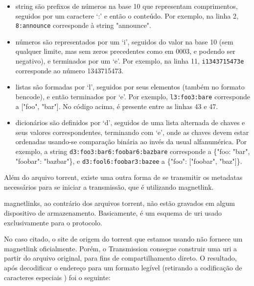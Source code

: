 \begin{itemize}
    \item \gls*{string} são prefixos de números na base 10 que representam
        comprimentos, seguidos por um caractere `:' e então o conteúdo. Por exemplo, na
        linha 2, \verb|8:announce| corresponde à \gls*{string} "announce".

    \item números são representados por um `i', seguidos do valor na base 10 (sem
        qualquer limite, mas sem zeros precedentes como em $0003$, e podendo ser
        negativo), e terminados por um `e'. Por exemplo, na linha 11,
        \verb|i1343715473e| corresponde ao número 1343715473.

    \item listas são formadas por `l', seguidos por seus elementos (também no formato
        \gls*{bencode}), e então terminados por `e'. Por exemplo, \verb|l3:foo3:bare|
        corresponde a ["foo", "bar"]. No código acima, é presente entre as linhas 43
        e 47.

    \item dicionários são definidos por `d', seguidos de uma lista alternada de chaves e
        seus valores correspondentes, terminando com `e', onde as chaves devem estar
        ordenadas usando-se comparação binária ao invés da usual alfanumérica.
        Por exemplo, a \gls*{string} \verb|d3:foo3:bar6:foobar6:bazbare| corresponde a
        \{"foo: "bar", "foobar": "bazbar"\}, e \verb|d3:fool6:foobar3:bazee| a
        \{"foo": ["foobar", "baz"]\}.
\end{itemize}

Além do arquivo \gls*{torrent}, existe uma outra forma de se transmitir os
\glspl*{metadata} necessários para se iniciar a transmissão, que é utilizando
\gls{magnetlink}.

\Glspl*{magnetlink}, ao contrário dos arquivos \gls*{torrent}, não estão gravados em
algum dispositivo de armazenamento. Basicamente, é um esquema de \gls{uri} usado
exclusivamente para o protocolo.

No caso citado, o site de origem do \gls*{torrent} que estamos usando não fornece um
\gls*{magnetlink} oficialmente. Porém, o Transmission consegue construir uma \gls*{uri}
a partir do arquivo original, para fins de compartilhamento direto. O resultado, após
decodificar o endereço para um formato legível (retirando a codificação de caracteres
especiais \cite{wiki:urlencode}) foi o seguinte:

